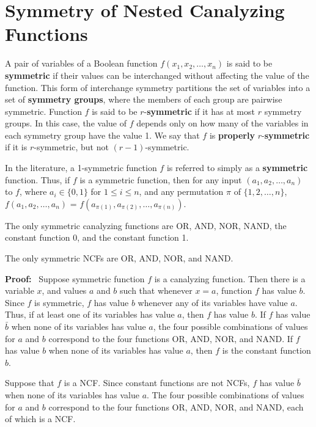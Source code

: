 \section{Symmetry of Nested Canalyzing Functions}
\label{sse:ncf_and_symmetry}

A pair of variables of a Boolean function $f(x_1, x_2, \ldots, x_n)$ is
said to be \textbf{symmetric} if their values can be interchanged without
affecting the value of the function.
This form of interchange symmetry partitions the set of variables into a set of 
 \textbf{symmetry groups}, where the members of each group are pairwise symmetric.
Function $f$ is said to be
$r$-\textbf{symmetric} if it has at most $r$ symmetry groups.
In this case, the value of $f$
depends only on how many of the variables in each symmetry group have the value 1.
We say that $f$ is \textbf{properly} $r$-\textbf{symmetric} if 
it is $r$-symmetric, but not $(r-1)$-symmetric.

In the literature, a 1-symmetric function $f$ is referred to simply 
as a \textbf{symmetric} function. 
Thus, if $f$ is a symmetric function, then for any
input $(a_1, a_2, \ldots, a_n)$ to $f$, where $a_i \in \{0,1\}$ for 
$1 \leq i \leq n$, and any permutation $\pi$ of $\{1, 2, \ldots, n\}$,
$f(a_1, a_2, \ldots, a_n)$ = $f(a_{\pi(1)}, a_{\pi(2)}, \ldots, a_{\pi(n)})$.

\begin{theorem}\label{thm:ncf_symmetric}
The only symmetric canalyzing functions are OR, AND, NOR, NAND, 
the constant function 0, and the constant function 1.

The only symmetric NCFs are OR, AND, NOR, and NAND.
\end{theorem}
\noindent
\textbf{Proof:}~
Suppose symmetric function $f$ is a canalyzing function. Then there is a variable $x$,
and values $a$ and $b$ such that whenever $x = a$, function $f$ has value $b$.
Since $f$ is symmetric, $f$  has value $b$ whenever any of its variables have value $a$.
Thus, if at least one of its variables has value $a$, then $f$ has value $b$.
If $f$ has value $\bar{b}$ when none of its variables has value $a$,
the four possible combinations of values for $a$ and $b$ correspond to the four functions
OR, AND, NOR, and NAND.
If $f$ has value $b$ when none of its variables has value $a$, then $f$ is the constant function $b$.

Suppose that $f$ is a NCF.
Since constant functions are not NCFs, 
$f$ has value $\bar{b}$ when none of its variables has value $a$.
The four possible combinations of values for $a$ and $b$ correspond to the four functions
OR, AND, NOR, and NAND, each of which is a NCF.
\QED

